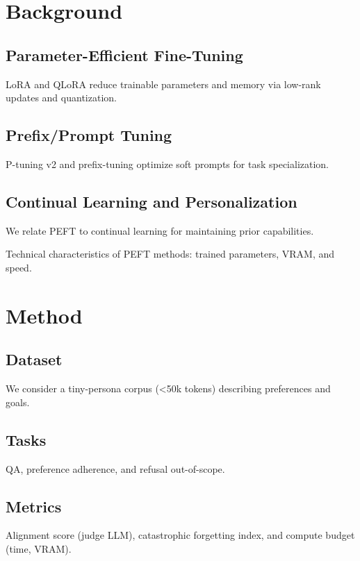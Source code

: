 \documentclass[10pt]{article}
\begin{document}
\section{Background}
\subsection{Parameter-Efficient Fine-Tuning}
LoRA and QLoRA reduce trainable parameters and memory via low-rank updates and quantization.

\subsection{Prefix/Prompt Tuning}
P-tuning v2 and prefix-tuning optimize soft prompts for task specialization.

\subsection{Continual Learning and Personalization}
We relate PEFT to continual learning for maintaining prior capabilities.

\begin{table}[t]
	\centering
	\caption{Technical characteristics of PEFT methods: trained parameters, VRAM, and speed.}
	\label{tab:tech}
	
\end{table}

\section{Method}
\subsection{Dataset}
We consider a tiny-persona corpus (\textless{}50k tokens) describing preferences and goals.

\subsection{Tasks}
QA, preference adherence, and refusal out-of-scope.

\subsection{Metrics}
Alignment score (judge LLM), catastrophic forgetting index, and compute budget (time, VRAM).

\end{document}
